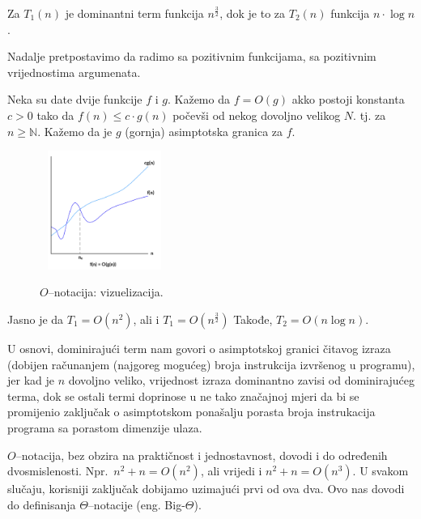 Za $T_1(n)$  je dominantni term funkcija $n^{\frac{3}{2}}$, dok je to za $T_2(n)$ funkcija $n \cdot \log n$. 
 
 Nadalje pretpostavimo da radimo sa pozitivnim funkcijama, sa pozitivnim vrijednostima argumenata. 


\begin{definition}
Neka su date dvije funkcije $f$ i $g$. Kažemo da $f = O(g)$ akko postoji konstanta $c >0$ tako da $f(n) \leq c \cdot g(n)$ počevši od nekog dovoljno velikog $N$. tj. za $n \geq \mathbb{N}$. Kažemo da je $g$ (gornja) asimptotska granica za $f$. 
\end{definition}

\begin{figure}[H]
	\centering
	\includegraphics[width=120pt,height=110pt]{slike/O_notation.png}
	\label{fig:O_notation}
	\caption{$O$--notacija: vizuelizacija.}
\end{figure}



\begin{example}
	Jasno je da $T_1 = O(n^2)$, ali i $T_1 = O(n^{\frac{3}{2}})$ Takođe, $T_2 = O(n \log n)$. 
\end{example}

U osnovi, dominirajući term nam govori o asimptotskoj granici čitavog izraza (dobijen računanjem (najgoreg mogućeg) broja instrukcija izvršenog u programu), jer kad je $n$ dovoljno veliko, vrijednost izraza dominantno zavisi od dominirajućeg terma, dok se ostali termi doprinose u ne tako značajnoj mjeri da bi se promijenio zaključak o asimptotskom ponašalju porasta broja instrukacija programa sa porastom dimenzije ulaza. 

$O$--notacija, bez obzira na praktičnost i jednostavnost, dovodi i do određenih  dvosmislenosti. Npr.\  $n^2 + n = O(n^2)$, ali vrijedi i $n^2 + n = O(n^3)$. U svakom slučaju, korisniji zaključak dobijamo uzimajući prvi od ova dva.  Ovo nas dovodi do definisanja $\Theta$--notacije (eng. Big-$\Theta$).

